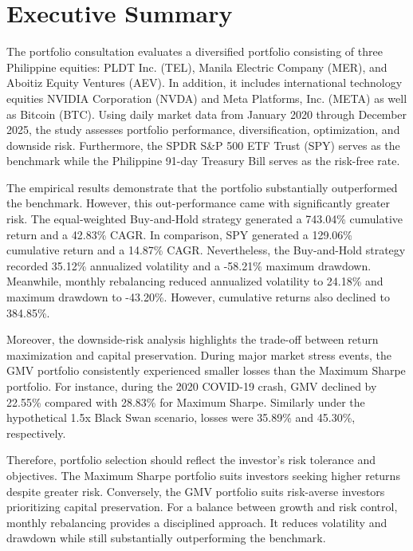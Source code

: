 \section*{Executive Summary}

The portfolio consultation evaluates a diversified portfolio consisting of three Philippine equities: PLDT Inc. (TEL), Manila Electric Company (MER), and Aboitiz Equity Ventures (AEV). In addition, it includes international technology equities NVIDIA Corporation (NVDA) and Meta Platforms, Inc. (META) as well as Bitcoin (BTC). Using daily market data from January 2020 through December 2025, the study assesses portfolio performance, diversification, optimization, and downside risk. Furthermore, the SPDR S\&P 500 ETF Trust (SPY) serves as the benchmark while the Philippine 91-day Treasury Bill serves as the risk-free rate.

The empirical results demonstrate that the portfolio substantially outperformed the benchmark. However, this out-performance came with significantly greater risk. The equal-weighted Buy-and-Hold strategy generated a 743.04\% cumulative return and a 42.83\% CAGR. In comparison, SPY generated a 129.06\% cumulative return and a 14.87\% CAGR. Nevertheless, the Buy-and-Hold strategy recorded 35.12\% annualized volatility and a -58.21\% maximum drawdown. Meanwhile, monthly rebalancing reduced annualized volatility to 24.18\% and maximum drawdown to -43.20\%. However, cumulative returns also declined to 384.85\%.

Moreover, the downside-risk analysis highlights the trade-off between return maximization and capital preservation. During major market stress events, the GMV portfolio consistently experienced smaller losses than the Maximum Sharpe portfolio. For instance, during the 2020 COVID-19 crash, GMV declined by 22.55\% compared with 28.83\% for Maximum Sharpe. Similarly under the hypothetical 1.5x Black Swan scenario, losses were 35.89\% and 45.30\%, respectively.

Therefore, portfolio selection should reflect the investor's risk tolerance and objectives. The Maximum Sharpe portfolio suits investors seeking higher returns despite greater risk. Conversely, the GMV portfolio suits risk-averse investors prioritizing capital preservation. For a balance between growth and risk control, monthly rebalancing provides a disciplined approach. It reduces volatility and drawdown while still substantially outperforming the benchmark.